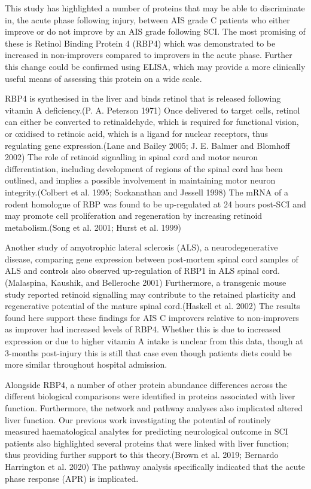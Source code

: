 \documentclass[9pt,lineno]{elife}
\begin{document}
This study has highlighted a number of proteins that may be able to discriminate in, the acute phase following injury, between AIS grade C patients who either improve or do not improve by an AIS grade following SCI.
The most promising of these is Retinol Binding Protein 4 (RBP4) which was demonstrated to be increased in non-improvers compared to improvers in the acute phase.
Further this change could be confirmed using ELISA, which may provide a more clinically useful means of assessing this protein on a wide scale.

RBP4 is synthesised in the liver and binds retinol that is released following vitamin A deficiency.(P. A. Peterson 1971)
Once delivered to target cells, retinol can either be converted to retinaldehyde, which is required for functional vision, or oxidised to retinoic acid, which is a ligand for nuclear receptors, thus regulating gene expression.(Lane and Bailey 2005; J. E. Balmer and Blomhoff 2002)
The role of retinoid signalling in spinal cord and motor neuron differentiation, including development of regions of the spinal cord has been outlined, and implies a possible involvement in maintaining motor neuron integrity.(Colbert et al. 1995; Sockanathan and Jessell 1998)
The mRNA of a rodent homologue of RBP was found to be up-regulated at 24 hours post-SCI and may promote cell proliferation and regeneration by increasing retinoid metabolism.(Song et al. 2001; Hurst et al. 1999)

Another study of amyotrophic lateral sclerosis (ALS), a neurodegenerative disease, comparing gene expression between post-mortem spinal cord samples of ALS and controls also observed up-regulation of RBP1 in ALS spinal cord.(Malaspina, Kaushik, and Belleroche 2001)
Furthermore, a transgenic mouse study reported retinoid signalling may contribute to the retained plasticity and regenerative potential of the mature spinal cord.(Haskell et al. 2002)
The results found here support these findings for AIS C improvers relative to non-improvers as improver had increased levels of RBP4.
Whether this is due to increased expression or due to higher vitamin A intake is unclear from this data, though at 3-months post-injury this is still that case even though patients diets could be more similar throughout hospital admission.

Alongside RBP4, a number of other protein abundance differences across the different biological comparisons were identified in proteins associated with liver function.
Furthermore, the network and pathway analyses also implicated altered liver function.
Our previous work investigating the potential of routinely measured haematological analytes for predicting neurological outcome in SCI patients also highlighted several proteins that were linked with liver function; thus providing further support to this theory.(Brown et al. 2019; Bernardo Harrington et al. 2020)
The pathway analysis specifically indicated that the acute phase response (APR) is implicated.
\end{document}
